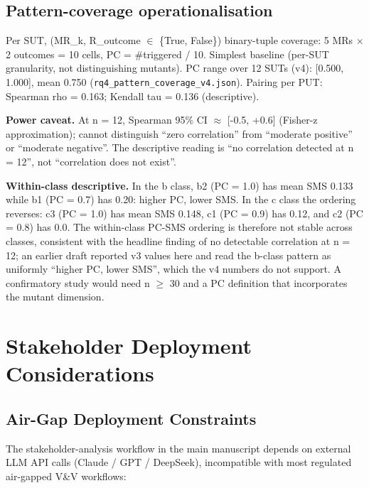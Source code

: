 \documentclass[review,12pt,authoryear]{elsarticle}
\begin{document}
\subsection{Pattern-coverage operationalisation}\label{d.5-pattern-coverage-operationalisation}

Per SUT, (MR\_k, R\_outcome $\in$ \{True, False\}) binary-tuple coverage: 5
MRs $\times$ 2 outcomes = 10 cells, PC = \#triggered / 10. Simplest baseline
(per-SUT granularity, not distinguishing mutants). PC range over 12
SUTs (v4): {[}0.500, 1.000{]}, mean 0.750
(\texttt{rq4\_pattern\_coverage\_v4.json}).
Pairing per PUT: Spearman rho = 0.163; Kendall tau = 0.136
(descriptive).

\textbf{Power caveat.} At n = 12, Spearman 95\% CI $\approx$ {[}-0.5, +0.6{]}
(Fisher-z approximation); cannot distinguish ``zero correlation'' from ``moderate positive'' or
``moderate negative''. The descriptive reading is ``no correlation detected
at n = 12'', not ``correlation does not exist''.

\textbf{Within-class descriptive.} In the b class, b2 (PC = 1.0) has
mean SMS 0.133 while b1 (PC = 0.7) has 0.20: higher PC, lower SMS. In
the c class the ordering reverses: c3 (PC = 1.0) has mean SMS 0.148,
c1 (PC = 0.9) has 0.12, and c2 (PC = 0.8) has 0.0. The within-class
PC-SMS ordering is therefore not stable across classes, consistent with
the headline finding of no detectable correlation at n = 12; an earlier
draft reported v3 values here and read the b-class pattern as
uniformly ``higher PC, lower SMS'', which the v4 numbers do not
support. A confirmatory study would need n $\geq$ 30 and a PC
definition that incorporates the mutant dimension.


\section{Stakeholder Deployment Considerations}\label{e.-stakeholder-deployment-considerations-single-output-kernels-scope}

\subsection{Air-Gap Deployment Constraints}\label{e.1-air-gap-incompatibility-full-justification}

The stakeholder-analysis workflow in the main manuscript depends on external LLM API calls (Claude / GPT /
DeepSeek), incompatible with most regulated air-gapped V\&V workflows:
\end{document}
